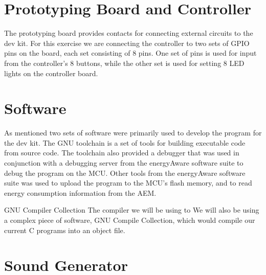 \section{Prototyping Board and Controller}

The prototyping board provides contacts for connecting external circuits to the
dev kit. \cite{DK3750Manual} For this exercise we are connecting the controller
to two sets of GPIO pins on the board, each set consisting of 8 pins. One set of
pins is used for input from the controller's 8 buttons, while the other set is
used for setting 8 LED lights on the controller board.

\section{Software}

As mentioned two sets of software were primarily used to develop the program for
the dev kit. The GNU toolchain is a set of tools for building executable code
from source code. The toolchain also provided a debugger that was used in
conjunction with a debugging server from the energyAware software suite to debug
the program on the MCU. Other tools from the energyAware software suite was used
to upload the program to the MCU's flash memory, and to read energy consumption
information from the AEM. \cite{TDT4528Compendium}

GNU Compiler Collection
The compiler we will be using to 
We will also be using a complex piece of software, GNU Compile Collection, which 
would compile our current C programs into an object file. 

\section{Sound Generator}

